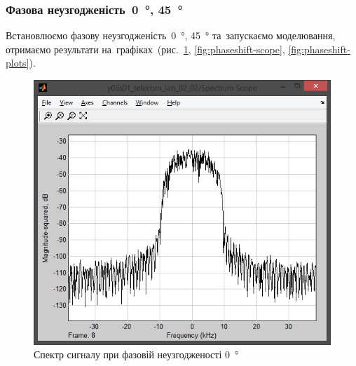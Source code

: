 \documentclass[
	a4paper,
	oneside,
	BCOR = 10mm,
	DIV = 12,
	12pt,
	headings = normal,
]{scrartcl}
\begin{document}
			\subsubsection{Фазова неузгодженість~\SI{0}{\degree}, \SI{45}{\degree}}
				Встановлюємо фазову неузгодженість~\SI{0}{\degree}, \SI{45}{\degree} та~запускаємо моделювання, отримаємо результати на~графіках~(рис.~\ref{fig:phaseshift-spectrum-scope}, \ref{fig:phaseshift-scope}, \ref{fig:phaseshift-plots}).

				\begin{figure}[!htbp]
					\begin{minipage}[t]{0.5\textwidth - 0.5em}
						\centering
						\includegraphics[height = 8\baselineskip]{../01-solution/00-SNR-100db-noshift-modulator-spectrum.png}
						\caption{Спектр сигналу при фазовій неузгодженості \SI{0}{\degree}}
						\label{fig:phaseshift-spectrum-scope}
					\end{minipage}\hspace{1em}%
					\begin{minipage}[t]{0.5\textwidth - 0.5em}
						\centering

\end{minipage}
\end{figure}
\end{document}

